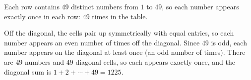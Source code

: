 Each row contains $49$ distinct numbers from $1$ to $49$, so each number appears exactly once in each row: $49$ times in the table.

Off the diagonal, the cells pair up symmetrically with equal entries, so each number appears an even number of times off the diagonal. Since $49$ is odd, each number appears on the diagonal at least once (an odd number of times). There are $49$ numbers and $49$ diagonal cells, so each appears exactly once, and the diagonal sum is $1+2+\cdots+49=\boxed{1225}$.
